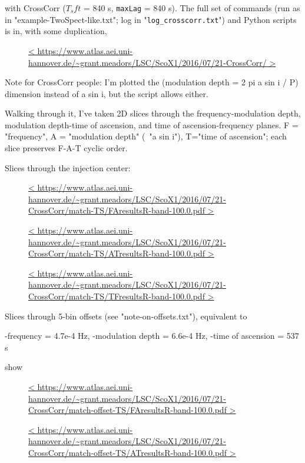 \documentclass{article}
\begin{document}
with CrossCorr ($T_sft$ = 840 s, \texttt{maxLag} = 840 s). The full set of commands
(run as in "example-TwoSpect-like.txt"; log in "\texttt{log\_crosscorr.txt}") and
Python scripts is in, with some duplication,

\begin{figure}
\caption{
\url{<
https://www.atlas.aei.uni-hannover.de/~grant.meadors/LSC/ScoX1/2016/07/21-CrossCorr/
>}
}
\end{figure}

Note for CrossCorr people: I'm plotted the (modulation depth = 2 pi a
sin i / P) dimension instead of a sin i, but the script allows either.

Walking through it, I've taken 2D slices through the
frequency-modulation depth, modulation depth-time of ascension, and time
of ascension-frequency planes. F = "frequency", A = "modulation depth"
(~"a sin i"), T="time of ascension"; each slice preserves F-A-T cyclic
order.

Slices through the injection center:

\begin{figure}
\caption{
\url{<
https://www.atlas.aei.uni-hannover.de/~grant.meadors/LSC/ScoX1/2016/07/21-CrossCorr/match-TS/FAresultsR-band-100.0.pdf
>}
}
\end{figure}

\begin{figure}
\caption{
\url{<
https://www.atlas.aei.uni-hannover.de/~grant.meadors/LSC/ScoX1/2016/07/21-CrossCorr/match-TS/ATresultsR-band-100.0.pdf
>}
}
\end{figure}

\begin{figure}
\caption{
\url{<
https://www.atlas.aei.uni-hannover.de/~grant.meadors/LSC/ScoX1/2016/07/21-CrossCorr/match-TS/TFresultsR-band-100.0.pdf
>}
}
\end{figure}


Slices through 5-bin offsets (see "note-on-offsets.txt"), equivalent to

    -frequency = 4.7e-4 Hz,
    -modulation depth = 6.6e-4 Hz,
    -time of ascension = 537 s

show

\begin{figure}
\caption{
\url{<
https://www.atlas.aei.uni-hannover.de/~grant.meadors/LSC/ScoX1/2016/07/21-CrossCorr/match-offset-TS/FAresultsR-band-100.0.pdf
>}
}
\end{figure}

\begin{figure}
\caption{
\url{<
https://www.atlas.aei.uni-hannover.de/~grant.meadors/LSC/ScoX1/2016/07/21-CrossCorr/match-offset-TS/ATresultsR-band-100.0.pdf
>}
}
\end{figure}
\end{document}
